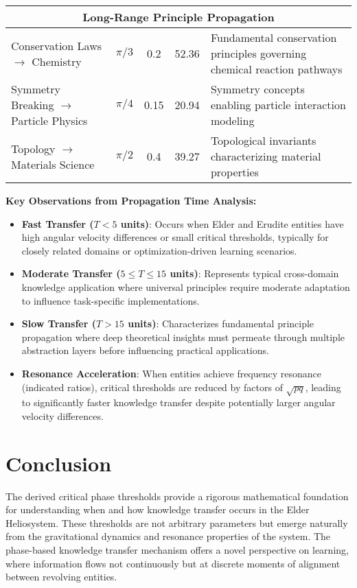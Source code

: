 \begin{table}[ht]
\begin{tabular}{|p{3.5cm}|c|c|c|p{4cm}|}
\hline
\hline
\multicolumn{5}{|c|}{\textbf{Long-Range Principle Propagation}} \\
\hline
Conservation Laws $\to$ Chemistry & $\pi/3$ & 0.2 & 52.36 & Fundamental conservation principles governing chemical reaction pathways \\
\hline
Symmetry Breaking $\to$ Particle Physics & $\pi/4$ & 0.15 & 20.94 & Symmetry concepts enabling particle interaction modeling \\
\hline
Topology $\to$ Materials Science & $\pi/2$ & 0.4 & 39.27 & Topological invariants characterizing material properties \\
\hline
\end{tabular}
\label{tab:knowledge_propagation_times}
\end{table}

\textbf{Key Observations from Propagation Time Analysis:}

\begin{itemize}
\item \textbf{Fast Transfer ($T < 5$ units)}: Occurs when Elder and Erudite entities have high angular velocity differences or small critical thresholds, typically for closely related domains or optimization-driven learning scenarios.

\item \textbf{Moderate Transfer ($5 \leq T \leq 15$ units)}: Represents typical cross-domain knowledge application where universal principles require moderate adaptation to influence task-specific implementations.

\item \textbf{Slow Transfer ($T > 15$ units)}: Characterizes fundamental principle propagation where deep theoretical insights must permeate through multiple abstraction layers before influencing practical applications.

\item \textbf{Resonance Acceleration}: When entities achieve frequency resonance (indicated ratios), critical thresholds are reduced by factors of $\sqrt{pq}$, leading to significantly faster knowledge transfer despite potentially larger angular velocity differences.
\end{itemize}

\section{Conclusion}

The derived critical phase thresholds provide a rigorous mathematical foundation for understanding when and how knowledge transfer occurs in the Elder Heliosystem. These thresholds are not arbitrary parameters but emerge naturally from the gravitational dynamics and resonance properties of the system. The phase-based knowledge transfer mechanism offers a novel perspective on learning, where information flows not continuously but at discrete moments of alignment between revolving entities.